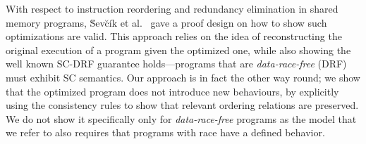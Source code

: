     With respect to instruction reordering and redundancy elimination in shared memory programs, \u{S}ev\u{c}\'{i}k et al.~\cite{Sevcik2} gave a proof design on how to show such optimizations are valid. This approach relies on the idea of reconstructing the original execution of a program given the optimized one, while also showing the well known SC-DRF guarantee holds---programs that are \textit{data-race-free} (DRF) must exhibit SC semantics. 
    Our approach is in fact the other way round; we show that the optimized program does not introduce new behaviours, by explicitly using the consistency rules to show that relevant ordering relations are preserved. 
    We do not show it specifically only for \textit{data-race-free} programs as the model that we refer to also requires that programs with race have a defined behavior. 